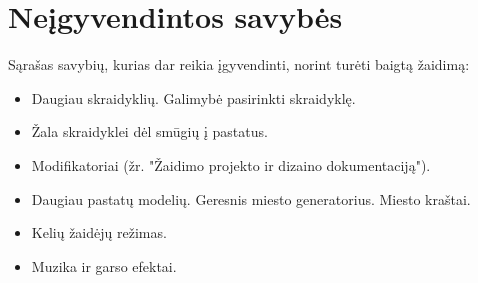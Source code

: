 \section{Neįgyvendintos savybės}

Sąrašas savybių, kurias dar reikia įgyvendinti, norint turėti baigtą žaidimą:
\begin{itemize}
\item Daugiau skraidyklių.
    Galimybė pasirinkti skraidyklę.
\item Žala skraidyklei dėl smūgių į pastatus.
\item Modifikatoriai (žr. "Žaidimo projekto ir dizaino dokumentaciją").
\item Daugiau pastatų modelių.
    Geresnis miesto generatorius.
    Miesto kraštai.
\item Kelių žaidėjų režimas.
\item Muzika ir garso efektai.
\end{itemize}
